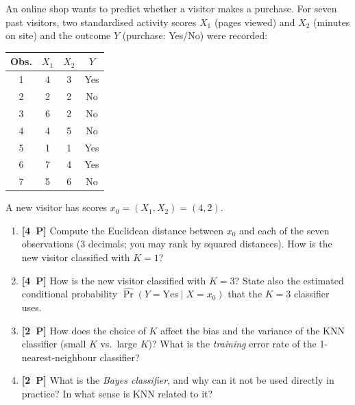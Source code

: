 \documentclass[11pt,a4paper]{article}
\newcommand{\pp}[1]{\textbf{[#1~P]}\enspace}
\begin{document}
An online shop wants to predict whether a visitor makes a purchase. For seven past visitors,
two standardised activity scores $X_1$ (pages viewed) and $X_2$ (minutes on site) and the
outcome $Y$ (purchase: Yes/No) were recorded:

\begin{center}
\begin{tabular}{cccc}
\toprule
Obs. & $X_1$ & $X_2$ & $Y$\\
\midrule
1 & 4 & 3 & Yes\\
2 & 2 & 2 & No\\
3 & 6 & 2 & No\\
4 & 4 & 5 & No\\
5 & 1 & 1 & Yes\\
6 & 7 & 4 & Yes\\
7 & 5 & 6 & No\\
\bottomrule
\end{tabular}
\end{center}

A new visitor has scores $x_0=(X_1,X_2)=(4,2)$.

\begin{enumerate}[label=(\alph*),leftmargin=7mm,itemsep=2.5mm]
  \item \pp{4} Compute the Euclidean distance between $x_0$ and each of the seven
    observations (3 decimals; you may rank by squared distances). How is the new visitor
    classified with $K=1$?
  \item \pp{4} How is the new visitor classified with $K=3$? State also the estimated
    conditional probability $\widehat{\Pr}(Y=\text{Yes}\mid X=x_0)$ that the $K=3$
    classifier uses.
  \item \pp{2} How does the choice of $K$ affect the bias and the variance of the KNN
    classifier (small $K$ vs.\ large $K$)? What is the \emph{training} error rate of the
    1-nearest-neighbour classifier?
  \item \pp{2} What is the \emph{Bayes classifier}, and why can it not be used directly in
    practice? In what sense is KNN related to it?
\end{enumerate}
\end{document}
